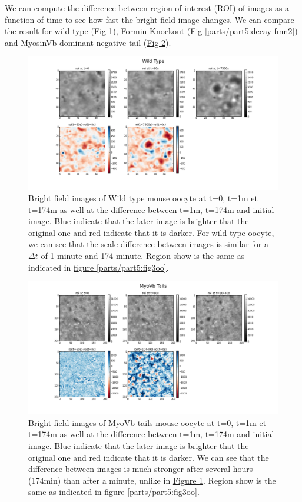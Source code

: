 \documentclass[A4paperpaper,11pt,english]{sphinxmanual}
\begin{document}
We can compute the difference between  region of interest (ROI) of images as a
function of time to see how fast the bright field image changes. We can compare
the result for wild type (\hyperref[parts/part5:decay-wt]{Fig  \ref*{parts/part5:decay-wt}}), Formin Knockout (\hyperref[parts/part5:decay-fmn2]{Fig  \ref*{parts/part5:decay-fmn2}}) and MyosinVb dominant negative tail (\hyperref[parts/part5:decay-myo]{Fig  \ref*{parts/part5:decay-myo}}).
\begin{figure}[htbp]
\centering
\capstart

\includegraphics[width=0.700\linewidth]{decay-wt.png}
\caption{Bright field images of Wild type mouse oocyte at t=0, t=1m et t=174m as
well at the difference between t=1m, t=174m and initial image. Blue
indicate that the later image is brighter that the original one and red
indicate that it is darker.  For wild type oocyte, we can see that the
scale difference between images is similar for a \(\Delta t\) of 1
minute and 174 minute. Region show is the same as indicated in \hyperref[parts/part5:fig3oo]{figure  \ref*{parts/part5:fig3oo}}.}\label{parts/part5:decay-wt}\end{figure}
\begin{figure}[htbp]
\centering
\capstart

\includegraphics[width=0.700\linewidth]{decay-myo.png}
\caption{Bright field images of MyoVb tails mouse oocyte at t=0, t=1m et t=174m as
well at the difference between t=1m, t=174m and initial image. Blue
indicate that the later image is brighter that the original one and red
indicate that it is darker.  We can see that the difference between images
is much stronger after several hours (174min) than after a minute, unlike
in \hyperref[parts/part5:decay-wt]{Figure  \ref*{parts/part5:decay-wt}}. Region show is the same as indicated in \hyperref[parts/part5:fig3oo]{figure  \ref*{parts/part5:fig3oo}}.}\label{parts/part5:decay-myo}\end{figure}
\end{document}
